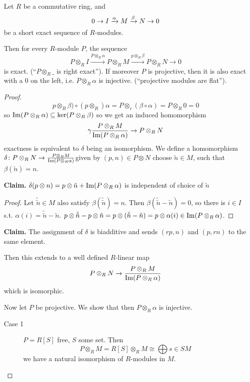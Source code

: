 \documentclass[language=english]{TemplateLecture}
\begin{document}
\begin{proposition}
    Let \(R\) be a commutative ring, and
    \[0 \rightarrow I \xrightarrow{\alpha} M \xrightarrow{\beta} N \to 0\]
    be a short exact sequence of \(R\)-modules.

    Then for every \(R\)-module \(P\), the sequence
    \[P\otimes_R I \xrightarrow{P\otimes_R \alpha} P \otimes_R M \xrightarrow{p\otimes_R \beta} P\otimes_R N \to 0\]
    is exact. (\enquote{\(P \otimes_R \_\) is right exact}). If moreover \(P\) is projective, then it is also exact with a \(0\) on the left, i.e. \(P\otimes_R \alpha\) is injective. (\enquote{projective modules are flat}).
\end{proposition}

\begin{proof}
    \[p\otimes_R \beta) \circ (p\otimes_R) \alpha = P\otimes_r (\beta\circ \alpha) = P\otimes_R 0 = 0\]
    so \(\operatorname{Im}(P\otimes_R \alpha) \subseteq \ker(P\otimes_R \beta)\) so we get an induced homomorphism
    \[\gamma \frac{P\otimes_R M}{\operatorname{Im}(P\otimes_R \alpha)} \to P\otimes_R N\]
    exactness is equivalent to \(\delta\) being an isomorphism.
    We define a homomorphism \(\delta\colon P\otimes_R N \to \frac{P\otimes_R M}{\operatorname{Im}(P\otimes_R \alpha)}\)given by \((p,n) \in P\otimes N\) choose \(\tilde n \in M\), such that \(\beta(\tilde n) = n\).

    \textbf{Claim.} \(\delta(p\otimes n) = p\otimes \tilde n + \operatorname{Im}(P\otimes_R \alpha)\) is independent of choice of \(\tilde n\)
    \begin{proof}
        Let \(\tilde\tilde n \in M\) also satisfy \(\beta(\tilde{\tilde n}) = n\). Then \(\beta(\tilde{\tilde n} - \tilde n) = 0\), so there is \(i \in I\) s.t. \(\alpha(i) = \tilde{\tilde n} - \tilde n\). \(p \otimes \tilde{\tilde n} - p\otimes \tilde n = p\otimes (\tilde{\tilde n} - \tilde n) = p\otimes \alpha(i) \in \operatorname{Im}(P\otimes_R \alpha)\).
    \end{proof}

    \textbf{Claim.} The assignment of \(\delta\) is biadditive and sends \((rp,n)\) and \((p, rn)\) to the same element.

    Then this extends to a well defined \(R\)-linear map
    \[P\otimes_R N \to \frac{P\otimes_R M}{\operatorname{Im}(P\otimes_R \alpha)}\]
    which is isomorphic.

    Now let \(P\) be projective. We show that then \(P \otimes_R \alpha\) is injective.

    \begin{description}
        \item[Case 1] \(P = R[S]\) free, \(S\) some set. Then
        \[P \otimes_R M = R[S] \otimes_R M \cong \bigoplus{s \in S} M\]
        we have a natural isomorphism of \(R\)-modules in \(M\).


\end{description}
\end{proof}
\end{document}
